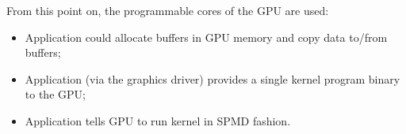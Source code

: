 \highspace
From this point on, the programmable cores of the GPU are used:
\begin{itemize}
    \item Application could allocate buffers in GPU memory and copy data to/from buffers;
    \item Application (via the graphics driver) provides a single kernel program binary to the GPU;
    \item Application tells GPU to run kernel in SPMD fashion.
\end{itemize}